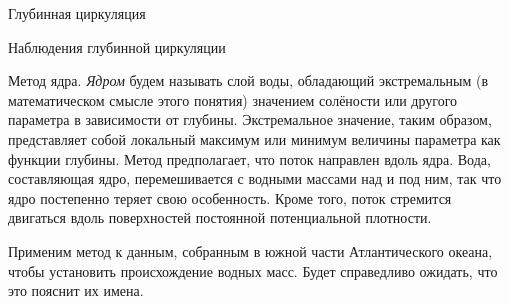 \begin{chapter}{Глубинная циркуляция}
\begin{section}{Наблюдения глубинной циркуляции}
\begin{paragraph}{Метод ядра.}
\emph{Ядром} будем называть слой воды, обладающий 
экстремальным (в математическом смысле этого понятия) значением солёности
или другого параметра в зависимости от глубины. Экстремальное значение, таким
образом, представляет собой локальный максимум или минимум величины
параметра как функции глубины. Метод предполагает, что поток направлен вдоль
ядра. Вода, составляющая ядро, перемешивается с водными массами над и под ним,
так что ядро постепенно теряет свою особенность. Кроме того, поток стремится
двигаться вдоль поверхностей постоянной потенциальной плотности.
%

Применим метод к данным, собранным в южной части Атлантического океана, чтобы
установить происхождение водных масс. Будет справедливо
ожидать, что это пояснит их имена.
%


\end{paragraph}
\end{section}
\end{chapter}

